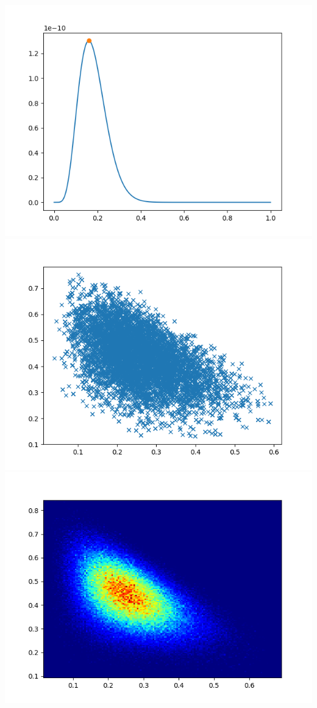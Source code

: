 \documentclass[pt12]{article}
\begin{document}
\newpage

\begin{center}
\includegraphics[scale=0.5]{hip27.png}\\
\includegraphics[scale=0.5]{sc27.png}\\
\includegraphics[scale=0.5]{den27.png}\\
\end{center}
\end{document}
